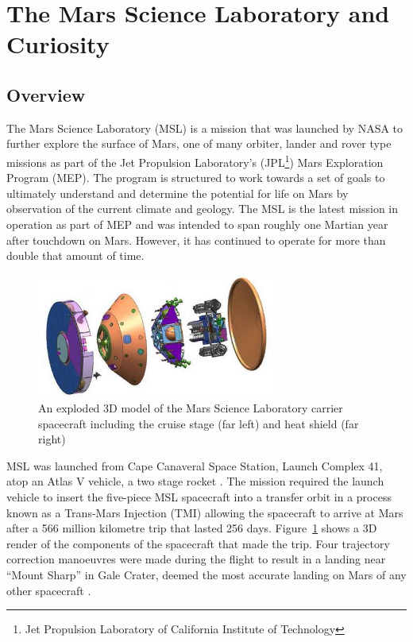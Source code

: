   \section{The Mars Science Laboratory and Curiosity}
    \subsection{Overview}
      The Mars Science Laboratory (MSL) is a mission that was launched by NASA to further explore the surface of Mars, one of many orbiter, lander and rover type missions as part of the Jet Propulsion Laboratory's (JPL\footnote{Jet Propulsion Laboratory of California Institute of Technology}) Mars Exploration Program (MEP). The program is structured to work towards a set of goals to ultimately understand and determine the potential for life on Mars \cite{meptheme} by observation of the current climate and geology. The MSL is the latest mission in operation as part of MEP and was intended to span roughly one Martian year after touchdown on Mars. However, it has continued to operate for more than double that amount of time. 
      
      \begin{figure}[ht]
        \centering
        \includegraphics[width=0.7\textwidth]{figures/mslSpacecraftExplodedView.jpg}
        \caption[An exploded 3D model of the Mars Science Laboratory carrier spacecraft including the cruise stage (far left) and heat shield (far right)]{An exploded 3D model of the Mars Science Laboratory carrier spacecraft including the cruise stage (far left) and heat shield (far right) \cite{fig:mslSpacecraftExplodedView_cite}}
        \label{fig:mslSpacecraftExplodedView}
      \end{figure}
      
      
      MSL was launched from Cape Canaveral Space Station, Launch Complex 41, atop an Atlas V vehicle, a two stage rocket \cite{harwood2014sfn}. The mission required the launch vehicle to insert the five-piece MSL spacecraft into a transfer orbit in a process known as a Trans-Mars Injection (TMI) allowing the spacecraft to arrive at Mars after a 566 million kilometre trip that lasted 256 days. Figure~\ref{fig:mslSpacecraftExplodedView} shows a 3D render of the components of the spacecraft that made the trip. Four trajectory correction manoeuvres were made during the flight to result in a landing near ``Mount Sharp'' in Gale Crater, deemed the most accurate landing on Mars of any other spacecraft \cite{martinmur}.
      
